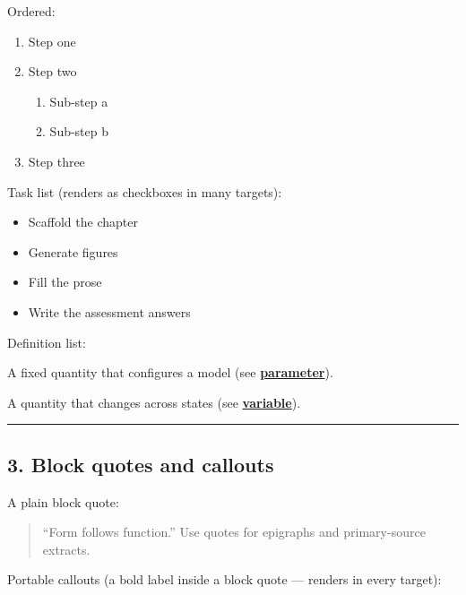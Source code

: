 \documentclass[
]{article}
\providecommand{\tightlist}{%
  \setlength{\itemsep}{0pt}\setlength{\parskip}{0pt}}
\theoremstyle{plain}
\theoremstyle{definition}
\begin{document}
Ordered:

\begin{enumerate}
\def\labelenumi{\arabic{enumi}.}
\tightlist
\item
  Step one
\item
  Step two

  \begin{enumerate}
  \def\labelenumii{\arabic{enumii}.}
  \tightlist
  \item
    Sub-step a
  \item
    Sub-step b
  \end{enumerate}
\item
  Step three
\end{enumerate}

Task list (renders as checkboxes in many targets):

\begin{itemize}
\tightlist
\item[$\boxtimes$]
  Scaffold the chapter
\item[$\boxtimes$]
  Generate figures
\item[$\square$]
  Fill the prose
\item[$\square$]
  Write the assessment answers
\end{itemize}

Definition list:

\begin{description}
\tightlist
\item[Parameter]
A fixed quantity that configures a model (see
\hyperref[gl:parameter]{\textbf{parameter}}).
\item[Variable]
A quantity that changes across states (see
\hyperref[gl:variable]{\textbf{variable}}).
\end{description}

\begin{center}\rule{0.5\linewidth}{0.5pt}\end{center}

\subsection{3. Block quotes and
callouts}\label{block-quotes-and-callouts}

A plain block quote:

\begin{quote}
``Form follows function.'' Use quotes for epigraphs and primary-source
extracts.
\end{quote}

Portable callouts (a bold label inside a block quote --- renders in
every target):
\end{document}

